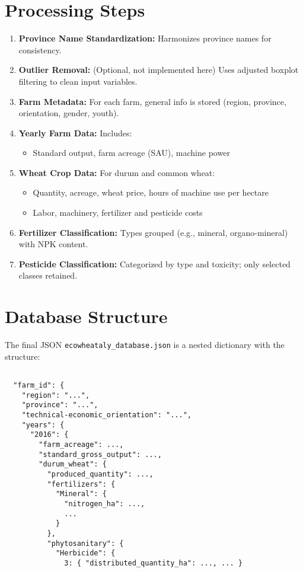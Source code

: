 \documentclass[11pt,a4paper]{article}
\begin{document}
\section*{Processing Steps}
\begin{enumerate}
    \item \textbf{Province Name Standardization:} Harmonizes province names for consistency.
    \item \textbf{Outlier Removal:} (Optional, not implemented here) Uses adjusted boxplot filtering to clean input variables.
    \item \textbf{Farm Metadata:} For each farm, general info is stored (region, province, orientation, gender, youth).
    \item \textbf{Yearly Farm Data:} Includes:
    \begin{itemize}
        \item Standard output, farm acreage (SAU), machine power
    \end{itemize}
    \item \textbf{Wheat Crop Data:} For durum and common wheat:
    \begin{itemize}
        \item Quantity, acreage, wheat price, hours of machine use per hectare
        \item Labor, machinery, fertilizer and pesticide costs
    \end{itemize}
    \item \textbf{Fertilizer Classification:} Types grouped (e.g., mineral, organo-mineral) with NPK content.
    \item \textbf{Pesticide Classification:} Categorized by type and toxicity; only selected classes retained.
\end{enumerate}

\section*{Database Structure}
The final JSON \texttt{ecowheataly\_database.json} is a nested dictionary with the structure:


\begin{verbatim}

  "farm_id": {
    "region": "...",
    "province": "...",
    "technical-economic_orientation": "...",
    "years": {
      "2016": {
        "farm_acreage": ...,
        "standard_gross_output": ...,
        "durum_wheat": {
          "produced_quantity": ...,
          "fertilizers": {
            "Mineral": {
              "nitrogen_ha": ...,
              ...
            }
          },
          "phytosanitary": {
            "Herbicide": {
              3: { "distributed_quantity_ha": ..., ... }

\end{verbatim}
\end{document}
